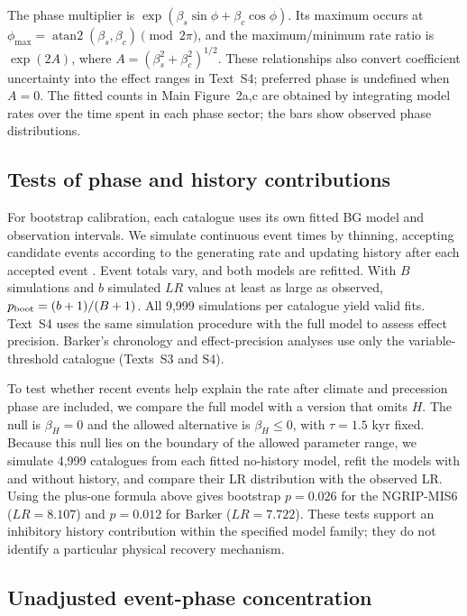 \documentclass[11pt]{article}
\begin{document}
The phase multiplier is $\exp(\beta_s\sin\phi+\beta_c\cos\phi)$. Its maximum occurs at $\phi_{\max}=\operatorname{atan2}(\beta_s,\beta_c)\pmod{2\pi}$, and the maximum/minimum rate ratio is $\exp(2A)$, where $A=(\beta_s^2+\beta_c^2)^{1/2}$. These relationships also convert coefficient uncertainty into the effect ranges in Text~S4; preferred phase is undefined when $A=0$. The fitted counts in Main Figure~2a,c are obtained by integrating model rates over the time spent in each phase sector; the bars show observed phase distributions.

\subsection*{Tests of phase and history contributions}

For bootstrap calibration, each catalogue uses its own fitted BG model and observation intervals. We simulate continuous event times by thinning, accepting candidate events according to the generating rate and updating history after each accepted event \citep{ogata1981simulation}. Event totals vary, and both models are refitted. With $B$ simulations and $b$ simulated $LR$ values at least as large as observed, $p_{\rm boot}=(b+1)/(B+1)$. All 9,999 simulations per catalogue yield valid fits. Text~S4 uses the same simulation procedure with the full model to assess effect precision. Barker's chronology and effect-precision analyses use only the variable-threshold catalogue (Texts~S3 and S4).

To test whether recent events help explain the rate after climate and precession phase are included, we compare the full model with a version that omits $H$. The null is $\beta_H=0$ and the allowed alternative is $\beta_H\leq0$, with $\tau=1.5$ kyr fixed. Because this null lies on the boundary of the allowed parameter range, we simulate 4,999 catalogues from each fitted no-history model, refit the models with and without history, and compare their LR distribution with the observed LR. Using the plus-one formula above gives bootstrap $p=0.026$ for the NGRIP-MIS6 ($LR=8.107$) and $p=0.012$ for Barker ($LR=7.722$). These tests support an inhibitory history contribution within the specified model family; they do not identify a particular physical recovery mechanism.

\subsection*{Unadjusted event-phase concentration}
\end{document}
